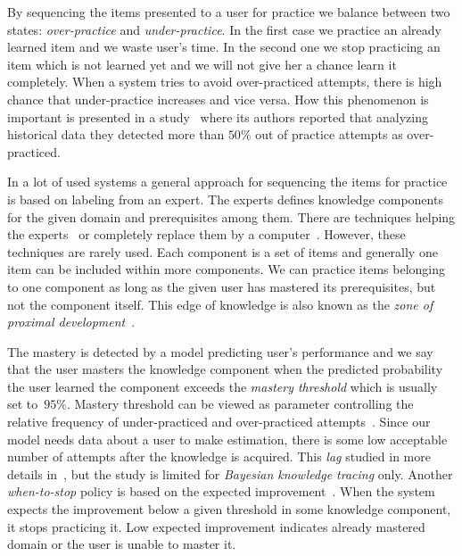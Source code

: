 \documentclass[table,color,cover,twoside,nolot,nolof]{fithesis3/fithesis3}
\begin{document}
By sequencing the items presented to a user for practice we balance between two
states: \emph{over-practice} and \emph{under-practice}. In the first case we
practice an already learned item and we waste user's time. In the second one we
stop practicing an item which is not learned yet and we will not give her a
chance learn it completely. When a system tries to avoid over-practiced
attempts, there is high chance that under-practice increases and vice versa.
How this phenomenon is important is presented in a study~\cite{cen2007over}
where its authors reported that analyzing historical data they detected more
than $50\%$ out of practice attempts as over-practiced.

In a lot of used systems a general approach for sequencing the items for
practice is based on labeling from an expert. The experts defines knowledge
components for the given domain and prerequisites among them. There are
techniques helping the ex\-perts~\cite{niznan2014using} or completely replace
them by a computer~\cite{boros2013automatic}. However, these techniques are
rarely used. Each component is a set of items and generally one item can be
included within more components. We can practice items belonging to one
component as long as the given user has mastered its prerequisites, but not the
component itself. This edge of knowledge is also known as the \emph{zone of
proximal development}~\cite{lee2005signifying}.

The mastery is detected by a model predicting user's performance and we say
that the user masters the knowledge component when the predicted probability
the user learned the component exceeds the \emph{mastery threshold} which is
usually set to~$95\%$. Mastery threshold can be viewed as parameter controlling
the relative frequency of under-practiced and over-practiced
attempts~\cite{fancsali2013optimal}. Since our model needs data about a user
to make estimation, there is some low acceptable number of attempts after the
knowledge is acquired. This \emph{lag} studied in more details
in~\cite{fancsali2013optimal}, but the study is limited for \emph{Bayesian
knowledge tracing} only. Another \emph{when-to-stop} policy is based on the
expected improvement~\cite{rollinson2015predictive}. When the system expects
the improvement below a given threshold in some knowledge component, it stops
practicing it. Low expected improvement indicates already mastered domain or
the user is unable to master it.
\end{document}
